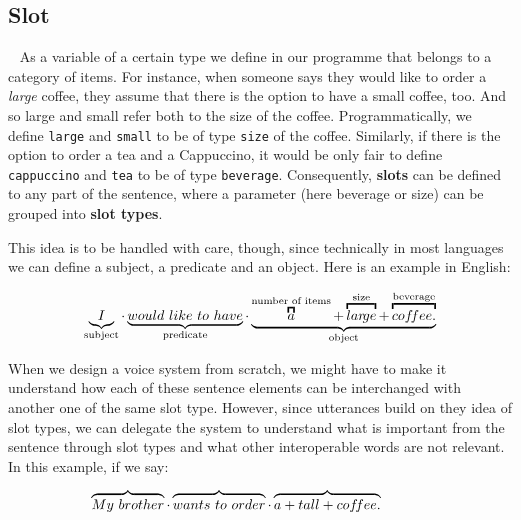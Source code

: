 	\subsection*{Slot}~\label{slots}
	As a variable of a certain type we define in our programme that belongs to a category of items. For instance, when someone says they would like to order a \textit{large} coffee, they assume that there is the option to have a small coffee, too. And so large and small refer both to the size of the coffee. Programmatically, we define \texttt{large} and \texttt{small} to be of type \texttt{size} of the coffee. Similarly, if there is the option to order a tea and a Cappuccino, it would be only fair to define \texttt{cappuccino} and \texttt{tea} to be of type \texttt{beverage}. Consequently, \textbf{slots} can be defined to any part of the sentence, where a parameter (here beverage or size) can be grouped into \textbf{slot types}. 



	This idea is to be handled with care, though, since technically in most languages we can define a subject, a predicate and an object. Here is an example in English:
	
	\[
	\underbrace{I}_\text{subject} \cdot
	\underbrace{would \ like  \ to \ have}_\text{predicate} \cdot
	\underbrace{
		\overbracket{a}^\text{number of items} +		
		\overbracket{lar\!ge}^\text{size} +
		\overbracket{cof \mkern-3mu fee.}^\text{beverage}
	}_\text{object} 
	\]
	
	When we design a voice system from scratch, we might have to make it understand how each of these sentence elements can be interchanged with another one of the same slot type. However, since utterances build on they idea of slot types, we can delegate the system to understand what is important from the sentence through slot types and what other interoperable words are not relevant. In this example, if we say:
	
	\[
	\overbrace{My \ brother} \cdot
	\overbrace{wants \ to \ order} \cdot
	\overbrace{ a + tall + cof\mkern-3mu fee.}
	\ \ \ \ \ \ \ \ \ \ 
	\]
	
